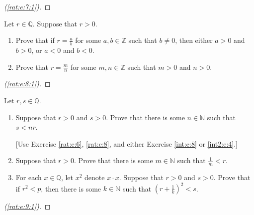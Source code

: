 \begin{proof}[(\ref{rat:e:7:1})]
	\TODO
\end{proof}


\Newpage
\begin{exercise} %
	\label{rat:e:8}
	Let $r \in \mathbb{Q}$. Suppose that $r > 0$.
	\begin{enumerate}
		\item Prove that if $r = \frac{a}{b}$ for some $a, b \in \mathbb{Z}$ such that $b \neq 0$, then either $a > 0$ and $b > 0$, or $a < 0$ and $b < 0$. \label{rat:e:8:1}
		\item Prove that $r = \frac{m}{n}$ for some $m, n \in \mathbb{Z}$ such that $m > 0$ and $n > 0$. \label{rat:e:8:2}
	\end{enumerate}
\end{exercise}

\begin{proof}[(\ref{rat:e:8:1})]
	\TODO
\end{proof}


\Newpage
\begin{exercise} %
	\label{rat:e:9}
	Let $r, s \in \mathbb{Q}$.
	\begin{enumerate}
		\item \label{rat:e:9:1}
		      Suppose that $r > 0$ and $s > 0$. Prove that there is some $n \in \mathbb{N}$ such that $s < n r$.

		      \hfill[Use Exercise \ref{rat:e:6}, \ref{rat:e:8}, and either Exercise \ref{int:e:8} or \ref{int2:e:4}.]
		\item \label{rat:e:9:2}
		      Suppose that $r > 0$. Prove that there is some $m \in \mathbb{N}$ such that $\frac{1}{m} < r$.
		\item \label{rat:e:9:3}
		      For each $x \in \mathbb{Q}$, let $x^{2}$ denote $x \cdot x$. Suppose that $r > 0$ and $s > 0$. Prove that if $r^{2} < p$, then there is some $k \in \mathbb{N}$ such that $\left( r + \frac{1}{k} \right)^{2} < s$.
	\end{enumerate}
\end{exercise}

\begin{proof}[(\ref{rat:e:9:1})]
	\TODO
\end{proof}


